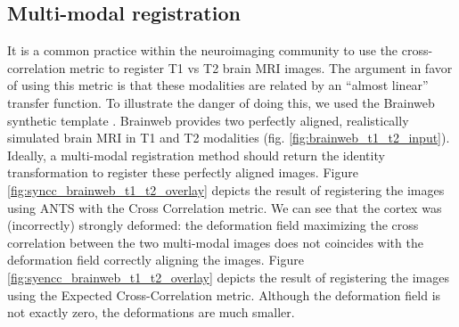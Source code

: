 \subsection{Multi-modal registration}
It is a common practice within the neuroimaging community to use the cross-correlation metric to register T1 vs T2 brain MRI images. The argument in favor of using
this metric is that these modalities are related by an ``almost linear'' transfer function. To illustrate the danger of doing this, we used the Brainweb synthetic
template \cite{Cocosco1997}\cite{Kwan1999}. Brainweb provides two perfectly aligned, realistically simulated brain MRI in T1 and T2 modalities
(fig. \ref{fig:brainweb_t1_t2_input}). Ideally, a multi-modal registration method should return the identity transformation to register these perfectly aligned images.
Figure \ref{fig:syncc_brainweb_t1_t2_overlay} depicts the result of registering the images using ANTS with the Cross Correlation metric. We can see that the cortex was
(incorrectly) strongly deformed: the deformation field maximizing the cross correlation between the two multi-modal images does not coincides with the deformation field
correctly aligning the images. Figure \ref{fig:syencc_brainweb_t1_t2_overlay} depicts the result of registering the images using the Expected Cross-Correlation metric.
Although the deformation field is not exactly zero, the deformations are much smaller.


